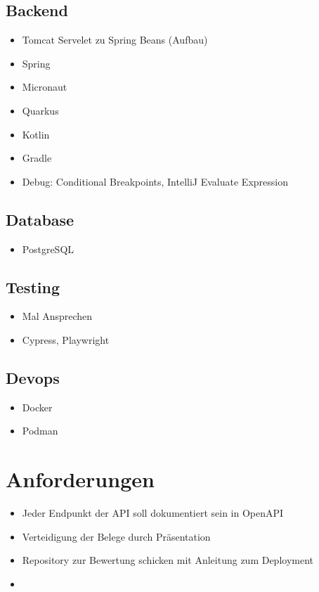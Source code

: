 \documentclass[../main.tex]{subfiles}
\begin{document}
\subsection{Backend}
\begin{itemize}
    \item Tomcat Servelet zu Spring Beans (Aufbau)
    \item Spring
    \item Micronaut
    \item Quarkus
    \item Kotlin
    \item Gradle
    \item Debug: Conditional Breakpoints, IntelliJ Evaluate Expression
\end{itemize}
\subsection{Database}
\begin{itemize}
    \item PostgreSQL
\end{itemize}
\subsection{Testing}
\begin{itemize}
    \item Mal Ansprechen
    \item Cypress, Playwright
\end{itemize}
\subsection{Devops}
\begin{itemize}
    \item Docker
    \item Podman
\end{itemize}

\section{Anforderungen}
\begin{itemize}
    \item Jeder Endpunkt der API soll dokumentiert sein in OpenAPI
    \item Verteidigung der Belege durch Präsentation
    \item Repository zur Bewertung schicken mit Anleitung zum Deployment 
    \item
\end{itemize}
\end{document}
